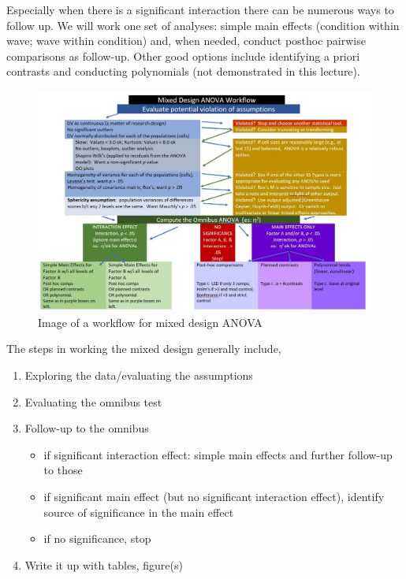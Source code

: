 \documentclass[
  11pt,
]{book}
\providecommand{\tightlist}{%
  \setlength{\itemsep}{0pt}\setlength{\parskip}{0pt}}
\begin{document}
Especially when there is a significant interaction there can be numerous ways to follow up. We will work one set of analyses: simple main effects (condition within wave; wave within condition) and, when needed, conduct posthoc pairwise comparisons as follow-up. Other good options include identifying a priori contrasts and conducting polynomials (not demonstrated in this lecture).

\begin{figure}
\centering
\includegraphics{images/mixed/mx_workflow.jpg}
\caption{Image of a workflow for mixed design ANOVA}
\end{figure}

The steps in working the mixed design generally include,

\begin{enumerate}
\def\labelenumi{\arabic{enumi}.}
\tightlist
\item
  Exploring the data/evaluating the assumptions
\item
  Evaluating the omnibus test
\item
  Follow-up to the omnibus

  \begin{itemize}
  \tightlist
  \item
    if significant interaction effect: simple main effects and further follow-up to those
  \item
    if significant main effect (but no significant interaction effect), identify source of significance in the main effect
  \item
    if no significance, stop
  \end{itemize}
\item
  Write it up with tables, figure(s)
\end{enumerate}
\end{document}
